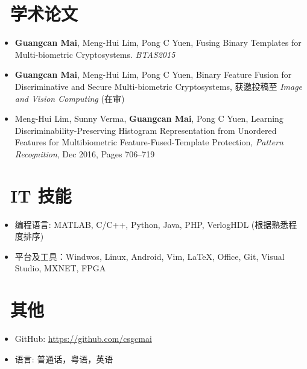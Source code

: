 \documentclass{resume}
\begin{document}
\section{\faBook\ 学术论文}
\begin{itemize}
	\item \textbf{Guangcan Mai}, Meng-Hui Lim, Pong C Yuen, Fusing Binary Templates for Multi-biometric Cryptosystems. \textit{BTAS2015}
	\item \textbf{Guangcan Mai}, Meng-Hui Lim, Pong C Yuen, Binary Feature Fusion for Discriminative and Secure Multi-biometric Cryptosystems, 获邀投稿至 \textit{Image and Vision Computing} (在审)
	\item Meng-Hui Lim, Sunny Verma, \textbf{Guangcan Mai}, Pong C Yuen, Learning Discriminability-Preserving Histogram Representation from Unordered Features for Multibiometric Feature-Fused-Template Protection, \textit{Pattern Recognition}, Dec 2016, Pages 706–719
\end{itemize}


\section{\faCogs\ IT 技能}
\begin{itemize}[parsep=0.5ex]
	\item 编程语言: MATLAB, C/C++, Python, Java, PHP, VerlogHDL (根据熟悉程度排序)
	\item 平台及工具：Windwos, Linux, Android,  Vim, \LaTeX, Office, Git, Visual Studio, MXNET, FPGA
\end{itemize}

\section{\faInfo\ 其他}
\begin{itemize}[parsep=0.5ex]
  \item GitHub: \url{https://github.com/csgcmai}
  \item 语言: 普通话，粤语，英语
\end{itemize}
\end{document}
